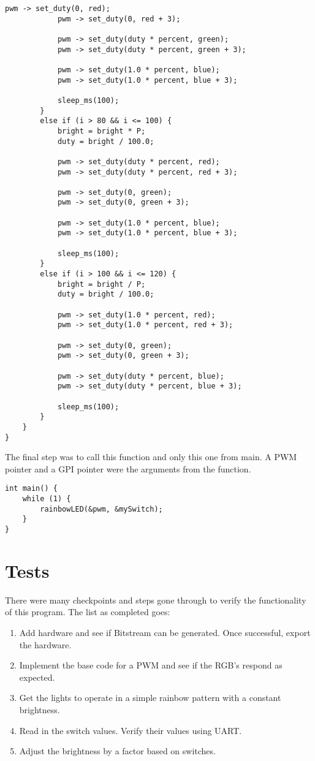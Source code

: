 \documentclass[11pt]{article}
\begin{document}
\begin{lstlisting}[style=CStyle, caption = Rainbow LED Function]
			pwm -> set_duty(0, red);
			pwm -> set_duty(0, red + 3);
			
			pwm -> set_duty(duty * percent, green);
			pwm -> set_duty(duty * percent, green + 3);
			
			pwm -> set_duty(1.0 * percent, blue);
			pwm -> set_duty(1.0 * percent, blue + 3);
			
			sleep_ms(100);
		}
		else if (i > 80 && i <= 100) {
			bright = bright * P;
			duty = bright / 100.0;
			
			pwm -> set_duty(duty * percent, red);
			pwm -> set_duty(duty * percent, red + 3);
			
			pwm -> set_duty(0, green);
			pwm -> set_duty(0, green + 3);
			
			pwm -> set_duty(1.0 * percent, blue);
			pwm -> set_duty(1.0 * percent, blue + 3);
			
			sleep_ms(100);
		}
		else if (i > 100 && i <= 120) {
			bright = bright / P;
			duty = bright / 100.0;
			
			pwm -> set_duty(1.0 * percent, red);
			pwm -> set_duty(1.0 * percent, red + 3);
			
			pwm -> set_duty(0, green);
			pwm -> set_duty(0, green + 3);
			
			pwm -> set_duty(duty * percent, blue);
			pwm -> set_duty(duty * percent, blue + 3);
			
			sleep_ms(100);
		}
	}
}
\end{lstlisting}

\quad The final step was to call this function and only this one from main. A PWM pointer and a GPI pointer were the arguments from the function.

\begin{lstlisting}[style=CStyle, caption = Main]
int main() {
	while (1) {
		rainbowLED(&pwm, &mySwitch);
	}
}
\end{lstlisting}

\section{Tests}
\quad There were many checkpoints and steps gone through to verify the functionality of this program. The list as completed goes: 
\begin{enumerate}
	\item Add hardware and see if Bitstream can be generated. Once successful, export the hardware. 
	\item Implement the base code for a PWM and see if the RGB's respond as expected. 
	\item Get the lights to operate in a simple rainbow pattern with a constant brightness. 
	\item Read in the switch values. Verify their values using UART. 
	\item Adjust the brightness by a factor based on switches. 
\end{enumerate}
\end{document}

